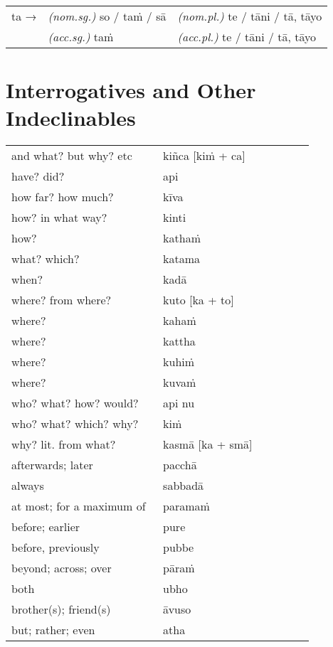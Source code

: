 \documentclass[a4paper]{memoir}
\begin{document}
\begin{center}
\begin{tabular}{lll}
ta → & \emph{(nom.sg.)} so / taṁ / sā & \emph{(nom.pl.)} te / tāni / tā, tāyo\\[0pt]
 & \emph{(acc.sg.)} taṁ & \emph{(acc.pl.)}  te / tāni / tā, tāyo\\[0pt]
\end{tabular}
\end{center}

\section{Interrogatives and Other Indeclinables}
\label{sec:org62ee2f9}

\begin{multicols}{2}

\begin{center}
\begin{tabular}{L{0.48\linewidth} L{0.48\linewidth}}
and what? but why? etc & kiñca [kiṁ + ca]\\[0pt]
have? did? & api\\[0pt]
how far? how much? & kīva\\[0pt]
how? in what way? & kinti\\[0pt]
how? & kathaṁ\\[0pt]
what? which? & katama\\[0pt]
when? & kadā\\[0pt]
where? from where? & kuto [ka + to]\\[0pt]
where? & kahaṁ\\[0pt]
where? & kattha\\[0pt]
where? & kuhiṁ\\[0pt]
where? & kuvaṁ\\[0pt]
who? what? how? would? & api nu\\[0pt]
who? what? which? why? & kiṁ\\[0pt]
why? lit. from what? & kasmā [ka + smā]\\[0pt]
afterwards; later & pacchā\\[0pt]
always & sabbadā\\[0pt]
at most; for a maximum of & paramaṁ\\[0pt]
before; earlier & pure\\[0pt]
before, previously & pubbe\\[0pt]
beyond; across; over & pāraṁ\\[0pt]
both & ubho\\[0pt]
brother(s); friend(s) & āvuso\\[0pt]
but; rather; even & atha\\[0pt]
\end{tabular}
\end{center}


\end{multicols}
\end{document}
